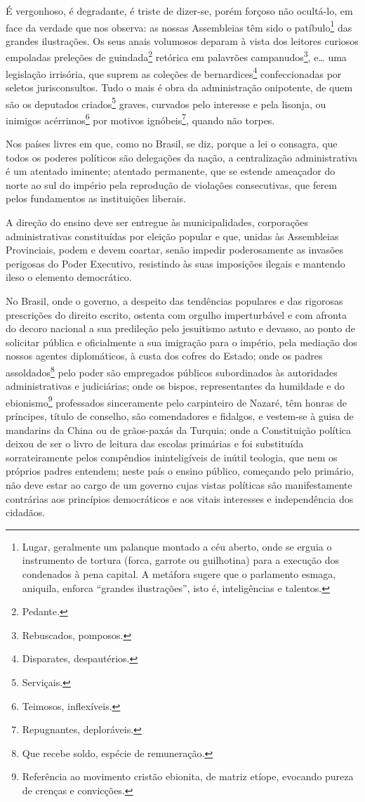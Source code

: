 É vergonhoso, é degradante, é triste de dizer-se, porém forçoso não
ocultá-lo, em face da verdade que nos observa: as nossas Assembleias têm
sido o patíbulo\footnote{Lugar, geralmente um palanque montado a céu
  aberto, onde se erguia o instrumento de tortura (forca, garrote ou
  guilhotina) para a execução dos condenados à pena capital. A metáfora
  sugere que o parlamento esmaga, aniquila, enforca ``grandes
  ilustrações'', isto é, inteligências e talentos.} das grandes
ilustrações. Os seus anais volumosos deparam à vista dos leitores
curiosos empoladas preleções de guindada\footnote{Pedante.} retórica
em palavrões campanudos\footnote{Rebuscados, pomposos.}, e\ldots{} uma
legislação irrisória, que suprem as coleções de bernardices\footnote{
  Disparates, despautérios.} confeccionadas por seletos jurisconsultos.
Tudo o mais é obra da administração onipotente, de quem são os deputados
criados\footnote{Serviçais.} graves, curvados pelo interesse e pela
lisonja, ou inimigos acérrimos\footnote{Teimosos, inflexíveis.} por
motivos ignóbeis\footnote{Repugnantes, deploráveis.}, quando não
torpes.

Nos países livres em que, como no Brasil, se diz, porque a lei o
consagra, que todos os poderes políticos são delegações da nação, a
centralização administrativa é um atentado iminente; atentado
permanente, que se estende ameaçador do norte ao sul do império pela
reprodução de violações consecutivas, que ferem pelos fundamentos as
instituições liberais.

A direção do ensino deve ser entregue às municipalidades, corporações
administrativas constituídas por eleição popular e que, unidas às
Assembleias Provinciais, podem e devem coartar, senão impedir
poderosamente as invasões perigosas do Poder Executivo, resistindo às
suas imposições ilegais e mantendo ileso o elemento democrático.

No Brasil, onde o governo, a despeito das tendências populares e das
rigorosas prescrições do direito escrito, ostenta com orgulho
imperturbável e com afronta do decoro nacional a sua predileção pelo
jesuitismo astuto e devasso, ao ponto de solicitar pública e
oficialmente a sua imigração para o império, pela mediação dos nossos
agentes diplomáticos, à custa dos cofres do Estado; onde os padres
assoldados\footnote{Que recebe soldo, espécie de remuneração.} pelo
poder são empregados públicos subordinados às autoridades
administrativas e judiciárias; onde os bispos, representantes da
humildade e do ebionismo\footnote{Referência ao movimento cristão
  ebionita, de matriz etíope, evocando pureza de crenças e convicções.}
professados sinceramente pelo carpinteiro de Nazaré, têm honras de
príncipes, título de conselho, são comendadores e fidalgos, e vestem-se
à guisa de mandarins da China ou de grãos-paxás da Turquia; onde a
Constituição política deixou de ser o livro de leitura das escolas
primárias e foi substituída sorrateiramente pelos compêndios
ininteligíveis de inútil teologia, que nem os próprios padres entendem;
neste país o ensino público, começando pelo primário, não deve estar ao
cargo de um governo cujas vistas políticas são manifestamente contrárias
aos princípios democráticos e aos vitais interesses e independência dos
cidadãos.

